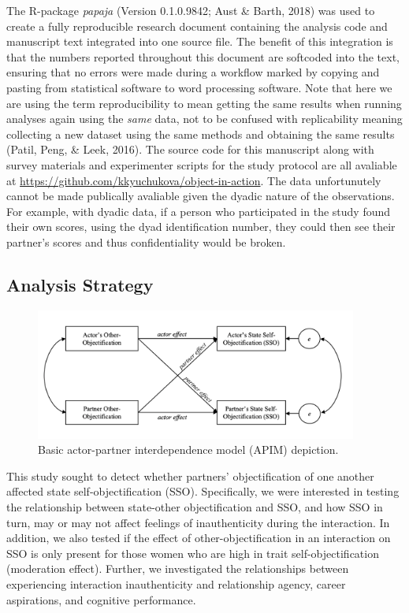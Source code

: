 \documentclass[man]{apa6}
\begin{document}
The R-package \emph{papaja} (Version 0.1.0.9842; Aust \& Barth, 2018)
was used to create a fully reproducible research document containing the
analysis code and manuscript text integrated into one source file. The
benefit of this integration is that the numbers reported throughout this
document are softcoded into the text, ensuring that no errors were made
during a workflow marked by copying and pasting from statistical
software to word processing software. Note that here we are using the
term reproducibility to mean getting the same results when running
analyses again using the \emph{same} data, not to be confused with
replicability meaning collecting a new dataset using the same methods
and obtaining the same results (Patil, Peng, \& Leek, 2016). The source
code for this manuscript along with survey materials and experimenter
scripts for the study protocol are all avaliable at
\url{https://github.com/kkyuchukova/object-in-action}. The data
unfortunutely cannot be made publically avaliable given the dyadic
nature of the observations. For example, with dyadic data, if a person
who participated in the study found their own scores, using the dyad
identification number, they could then see their partner's scores and
thus confidentiality would be broken.

\subsection{Analysis Strategy}\label{analysis-strategy}

\begin{figure}
\includegraphics[width=400px]{figures/APIM_figure} \caption{Basic actor-partner interdependence model (APIM) depiction.}\label{fig:apim}
\end{figure}

This study sought to detect whether partners' objectification of one
another affected state self-objectification (SSO). Specifically, we were
interested in testing the relationship between state-other
objectification and SSO, and how SSO in turn, may or may not affect
feelings of inauthenticity during the interaction. In addition, we also
tested if the effect of other-objectification in an interaction on SSO
is only present for those women who are high in trait
self-objectification (moderation effect). Further, we investigated the
relationships between experiencing interaction inauthenticity and
relationship agency, career aspirations, and cognitive performance.
\end{document}
